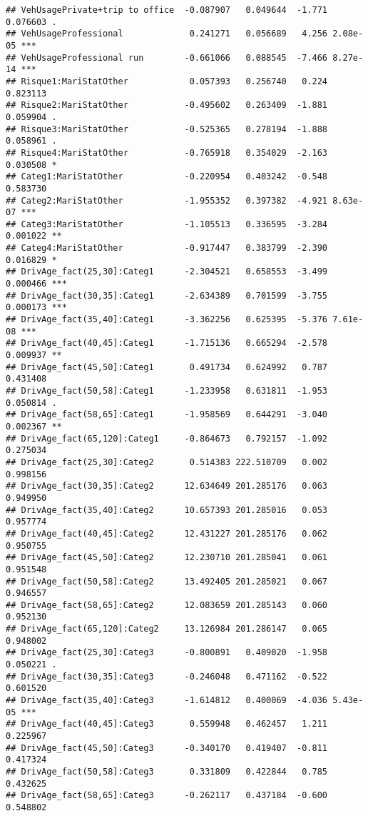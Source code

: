 \documentclass[
]{article}
\begin{document}
\begin{verbatim}
## VehUsagePrivate+trip to office  -0.087907   0.049644  -1.771 0.076603 .  
## VehUsageProfessional             0.241271   0.056689   4.256 2.08e-05 ***
## VehUsageProfessional run        -0.661066   0.088545  -7.466 8.27e-14 ***
## Risque1:MariStatOther            0.057393   0.256740   0.224 0.823113    
## Risque2:MariStatOther           -0.495602   0.263409  -1.881 0.059904 .  
## Risque3:MariStatOther           -0.525365   0.278194  -1.888 0.058961 .  
## Risque4:MariStatOther           -0.765918   0.354029  -2.163 0.030508 *  
## Categ1:MariStatOther            -0.220954   0.403242  -0.548 0.583730    
## Categ2:MariStatOther            -1.955352   0.397382  -4.921 8.63e-07 ***
## Categ3:MariStatOther            -1.105513   0.336595  -3.284 0.001022 ** 
## Categ4:MariStatOther            -0.917447   0.383799  -2.390 0.016829 *  
## DrivAge_fact(25,30]:Categ1      -2.304521   0.658553  -3.499 0.000466 ***
## DrivAge_fact(30,35]:Categ1      -2.634389   0.701599  -3.755 0.000173 ***
## DrivAge_fact(35,40]:Categ1      -3.362256   0.625395  -5.376 7.61e-08 ***
## DrivAge_fact(40,45]:Categ1      -1.715136   0.665294  -2.578 0.009937 ** 
## DrivAge_fact(45,50]:Categ1       0.491734   0.624992   0.787 0.431408    
## DrivAge_fact(50,58]:Categ1      -1.233958   0.631811  -1.953 0.050814 .  
## DrivAge_fact(58,65]:Categ1      -1.958569   0.644291  -3.040 0.002367 ** 
## DrivAge_fact(65,120]:Categ1     -0.864673   0.792157  -1.092 0.275034    
## DrivAge_fact(25,30]:Categ2       0.514383 222.510709   0.002 0.998156    
## DrivAge_fact(30,35]:Categ2      12.634649 201.285176   0.063 0.949950    
## DrivAge_fact(35,40]:Categ2      10.657393 201.285016   0.053 0.957774    
## DrivAge_fact(40,45]:Categ2      12.431227 201.285176   0.062 0.950755    
## DrivAge_fact(45,50]:Categ2      12.230710 201.285041   0.061 0.951548    
## DrivAge_fact(50,58]:Categ2      13.492405 201.285021   0.067 0.946557    
## DrivAge_fact(58,65]:Categ2      12.083659 201.285143   0.060 0.952130    
## DrivAge_fact(65,120]:Categ2     13.126984 201.286147   0.065 0.948002    
## DrivAge_fact(25,30]:Categ3      -0.800891   0.409020  -1.958 0.050221 .  
## DrivAge_fact(30,35]:Categ3      -0.246048   0.471162  -0.522 0.601520    
## DrivAge_fact(35,40]:Categ3      -1.614812   0.400069  -4.036 5.43e-05 ***
## DrivAge_fact(40,45]:Categ3       0.559948   0.462457   1.211 0.225967    
## DrivAge_fact(45,50]:Categ3      -0.340170   0.419407  -0.811 0.417324    
## DrivAge_fact(50,58]:Categ3       0.331809   0.422844   0.785 0.432625    
## DrivAge_fact(58,65]:Categ3      -0.262117   0.437184  -0.600 0.548802    

\end{verbatim}
\end{document}
